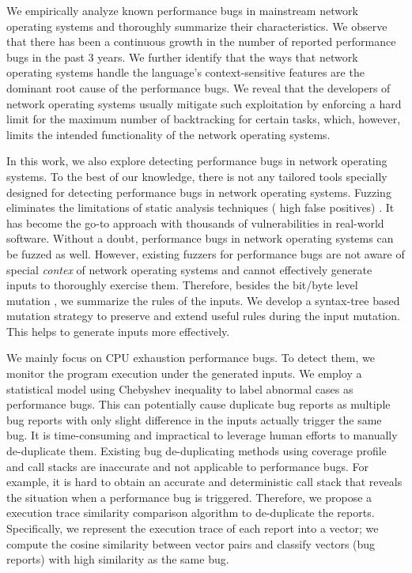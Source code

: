 We empirically analyze \XX known performance bugs in mainstream network operating systems and thoroughly summarize their characteristics.
%
We observe that there has been a continuous growth in the number of reported performance bugs in the past 3 years.
%
We further identify that the ways that network operating systems handle the language's context-sensitive features are the dominant root cause of the performance bugs.
%
We reveal that the developers of network operating systems usually mitigate such exploitation by enforcing a hard limit for the maximum number of backtracking for certain tasks, which, however, limits the intended functionality of the network operating systems.


In this work, we also explore detecting performance bugs in network operating systems.
%
To the best of our knowledge, there is not any tailored tools specially designed for detecting performance bugs in network operating systems.
%
Fuzzing \cite{slowfuzz, hotfuzz, perffuzz} eliminates the limitations of static analysis techniques 
(\eg{,} high false positives) 
\cite{perfbugstudy, nistor2013toddler,nistor2015caramel}.
%
It has become the go-to approach with thousands of vulnerabilities in real-world software.
%
Without a doubt, performance bugs in network operating systems can be fuzzed as well.
%
However, existing fuzzers \cite{slowfuzz, perffuzz} for performance bugs are not aware of special \emph{contex} of network operating systems and cannot effectively generate inputs to thoroughly exercise them.
%
Therefore, besides the bit/byte level mutation \cite{afl}, we summarize the rules of the inputs. 
%
We develop a syntax-tree based mutation strategy \cite{superion} to preserve and extend useful rules during the input mutation.
%
This helps to generate inputs more effectively.
%

We mainly focus on CPU exhaustion performance bugs.
%
To detect them, we monitor the program execution under the generated inputs.
%
We employ a statistical model using Chebyshev inequality to label abnormal cases as performance bugs.
%
This can potentially cause duplicate bug reports as multiple bug reports with only slight difference in the inputs actually trigger the same bug.
%
It is time-consuming and impractical to leverage human efforts to manually de-duplicate them.
%
Existing bug de-duplicating methods using coverage profile and call stacks are inaccurate and not applicable to performance bugs.
%
For example, it is hard to obtain an accurate and deterministic call stack that reveals the situation when a performance bug is triggered.
%
Therefore, we propose a execution trace similarity comparison algorithm to de-duplicate the reports.
%
Specifically, we represent the execution trace of each report into a vector;
%
we compute the cosine similarity between vector pairs and classify vectors (bug reports) with high similarity as the same bug.
%

